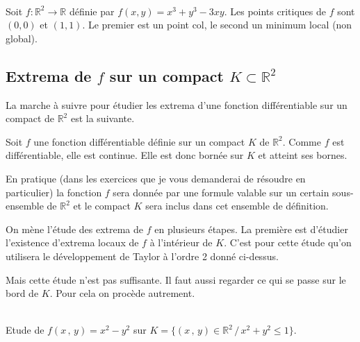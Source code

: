 \documentclass[12pt, class=report,crop=false]{standalone}
\begin{document}
{{%
\\
Soit $f:\mathbb R^2 \to \mathbb R$ définie par $f(x,y)=x^3+y^3-3xy$. Les points critiques de $f$ sont $(0,0)$ et $(1,1)$. Le premier est un point col, le second un minimum local (non global).

\subsection{Extrema de $f$ sur un compact $K \subset \mathbb{R}^2$}

La marche \`a suivre pour étudier les extrema d'une fonction différentiable sur un compact de $\mathbb{R}^2$ est la suivante.

Soit $f$ une fonction différentiable définie sur un compact $K$ de $\mathbb{R}^2$. Comme $f$ est différentiable, elle est continue. Elle est donc bornée sur $K$ et atteint ses bornes.

En pratique (dans les exercices que je vous demanderai de résoudre en particulier) la fonction $f$ sera donnée par une formule valable sur un certain sous-ensemble de $\mathbb{R}^2$ et le compact $K$ sera inclus dans cet ensemble de définition.

On m\`ene l'étude des extrema de $f$ en plusieurs étapes. La premi\`ere est d'étudier l'existence d'extrema locaux de $f$ \`a l'intérieur de $K$. C'est pour cette étude qu'on utilisera le développement de Taylor \`a l'ordre 2 donné ci-dessus.

Mais cette étude n'est pas suffisante. Il faut aussi regarder ce qui se passe sur le bord de $K$. Pour cela on proc\`ede autrement.

\\
Etude de $f(x\,,\,y) = x^2 - y^2$ sur $K = \lbrace (x\,,\,y) \in \mathbb{R}^2 \,/\, x^2 + y^2 \leqslant 1 \rbrace$.
}}
\end{document}
